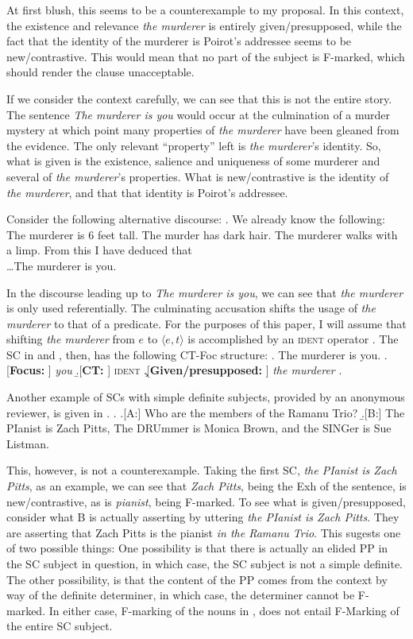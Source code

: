 \documentclass[
	letterpaper,
]{article}
\begin{document}
At first blush, this seems to be a counterexample to my proposal.
In this context, the existence and relevance \textit{the murderer} is entirely given/presupposed, while the fact that the identity of the murderer is Poirot's addressee seems to be new/contrastive. 
This would mean that no part of the subject is F-marked, which should render the clause unacceptable.

If we consider the context carefully, we can see that this is not the entire story.
The sentence \textit{The murderer is you} would occur at the culmination of a murder mystery at which point many properties of \textit{the murderer} have been gleaned from the evidence.
The only relevant ``property'' left is \textit{the murderer}'s identity.
So, what is given is the existence, salience and uniqueness of  some murderer and several of \textit{the murderer}'s properties.
What is new/contrastive is the identity of \textit{the murderer}, and that that identity is Poirot's addressee.

Consider the following alternative discourse:
\ex. We already know the following: The murderer is 6 feet tall. The murder has dark hair. The murderer walks with a limp. From this I have deduced that \\
\ldots The murderer is you.

In the discourse leading up to \textit{The murderer is you}, we can see that \textit{the murderer} is only used referentially.
The culminating accusation shifts the usage of \textit{the murderer} to that of a predicate.
For the purposes of this paper, I will assume that shifting \textit{the murderer} from $e$ to $\langle e, t\rangle$ is accomplished by an \textsc{ident} operator \parencite[cf.][]{partee1987noun}.
The SC in \Last and \LLast, then, has the following CT-Foc structure:
\ex. The murderer is you.
\a.[\textbf{Focus: }] \textit{you}
\b.[\textbf{CT: }] \textsc{ident}
\c.[\textbf{Given/presupposed:} ] \textit{the murderer}
\z.

Another example of SCs with simple definite subjects, provided by an anonymous reviewer, is given in \Next.
\ex. 
\a.[A:] Who are the members of the Ramanu Trio?
\b.[B:] The PIanist is Zach Pitts, The DRUmmer is Monica Brown, and the SINGer is Sue Listman.

This, however, is not a counterexample.
Taking the first SC, \textit{the PIanist is Zach Pitts}, as an example, we can see that \textit{Zach Pitts}, being the Exh of the sentence, is new/contrastive, as is \textit{pianist}, being F-marked.
To see what is given/presupposed, consider what B is actually asserting by uttering \textit{the PIanist is Zach Pitts}.
They are asserting that Zach Pitts is the pianist \textit{in the Ramanu Trio}.
This sugests one of two possible things:
One possibility is that there is actually an elided PP in the SC subject in question, in which case, the SC subject is not a simple definite.
The other possibility, is that the content of the PP comes from the context by way of the definite determiner, in which case, the determiner cannot be F-marked.
In either case, F-marking of the nouns in \Last, does not entail F-Marking of the entire SC subject.
\end{document}
